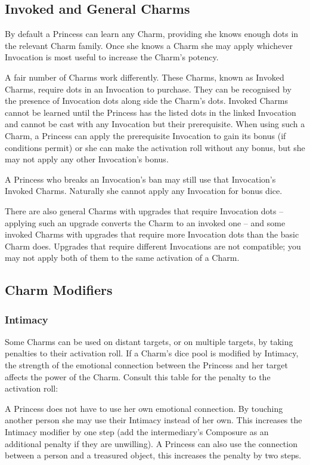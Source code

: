 \subsection*{Invoked and General Charms}

By default a Princess can learn any Charm, providing she knows enough dots in the relevant Charm family. Once she knows a Charm she may apply whichever Invocation is most useful to increase the Charm's potency. 

A fair number of Charms work differently. These Charms, known as Invoked Charms, require dots in an Invocation to purchase. They can be recognised by the presence of Invocation dots along side the Charm's dots. Invoked Charms cannot be learned until the Princess has the listed dots in the linked Invocation and cannot be cast with any Invocation but their prerequisite. When using such a Charm, a Princess can apply the prerequisite Invocation to gain its bonus (if conditions permit) or she can make the activation roll without any bonus, but she may not apply any other Invocation's bonus. 

A Princess who breaks an Invocation's ban may still use that Invocation's Invoked Charms. Naturally she cannot apply any Invocation for bonus dice. 

There are also general Charms with upgrades that require Invocation dots -- applying such an upgrade converts the Charm to an invoked one -- and some invoked Charms with upgrades that require more Invocation dots than the basic Charm does. Upgrades that require different Invocations are not compatible; you may not apply both of them to the same activation of a Charm. 

\subsection*{Charm Modifiers}

\subsubsection*{Intimacy}

Some Charms can be used on distant targets, or on multiple targets, by taking penalties to their activation roll.  If a Charm's dice pool is modified by Intimacy, the strength of the emotional connection between the Princess and her target affects the power of the Charm.  Consult this table for the penalty to the activation roll: 

A Princess does not have to use her own emotional connection. By touching another person she may use their Intimacy instead of her own. This increases the Intimacy modifier by one step (add the intermediary's Composure as an additional penalty if they are unwilling). A Princess can also use the connection between a person and a treasured object, this increases the penalty by two steps. 

